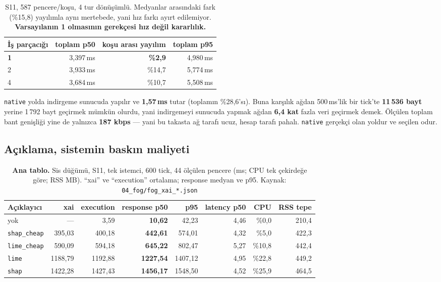 \documentclass[11pt,a4paper]{article}
\newcommand{\ms}{\,ms}
\newcommand{\kod}[1]{\texttt{\small #1}}
\newcommand{\dosya}[1]{\texttt{\footnotesize #1}}
\begin{document}
\begin{table}[H]
\centering\small
\begin{tabular}{@{}lrrr@{}}
\toprule
\textbf{İş parçacığı} & \textbf{toplam p50} & \textbf{koşu arası yayılım} & \textbf{toplam p95} \\
\midrule
\textbf{1} & 3{,}397\ms & \textbf{\%2{,}9} & 4{,}980\ms \\
2 & 3{,}933\ms & \%14{,}7 & 5{,}774\ms \\
4 & 3{,}684\ms & \%10{,}7 & 5{,}508\ms \\
\bottomrule
\end{tabular}
\caption{S11, 587 pencere/koşu, 4 tur dönüşümlü. Medyanlar arasındaki fark
(\%15{,}8) yayılımla aynı mertebede, yani hız farkı ayırt edilemiyor.
\textbf{Varsayılanın 1 olmasının gerekçesi hız değil kararlılık.}}
\end{table}

\begin{bulgu}
\kod{native} yolda indirgeme sunucuda yapılır ve \textbf{1{,}57\ms}{} tutar
(toplamın \%28{,}6'sı). Buna karşılık ağdan 500\ms'lik bir tick'te
\textbf{11\,536 bayt} yerine 1\,792 bayt geçirmek mümkün olurdu, yani
indirgemeyi sunucuda yapmak ağdan \textbf{6{,}4 kat} fazla veri geçirmek
demek. Ölçülen toplam bant genişliği yine de yalnızca \textbf{187 kbps} ---
yani bu takasta ağ tarafı ucuz, hesap tarafı pahalı. \kod{native} gerçekçi
olan yoldur ve seçilen odur.
\end{bulgu}

\subsection{Açıklama, sistemin baskın maliyeti}

\begin{table}[H]
\centering\footnotesize
\begin{tabular}{@{}lrrrrrrr@{}}
\toprule
\textbf{Açıklayıcı} & \textbf{xai} & \textbf{execution} & \textbf{response p50} & \textbf{p95} & \textbf{latency p50} & \textbf{CPU} & \textbf{RSS tepe} \\
\midrule
yok               & ---       & 3{,}59  & \textbf{10{,}62}  & 42{,}23  & 4{,}46 & \%0{,}0 & 210{,}4 \\
\kod{shap\_cheap} & 395{,}03  & 400{,}18 & \textbf{442{,}61} & 574{,}01 & 4{,}32 & \%5{,}0 & 422{,}3 \\
\kod{lime\_cheap} & 590{,}09  & 594{,}18 & \textbf{645{,}22} & 802{,}47 & 5{,}27 & \%10{,}8 & 442{,}4 \\
\kod{lime}        & 1188{,}79 & 1192{,}88 & \textbf{1227{,}54} & 1407{,}12 & 4{,}95 & \%22{,}8 & 449{,}2 \\
\kod{shap}        & 1422{,}28 & 1427{,}43 & \textbf{1456{,}17} & 1548{,}50 & 4{,}52 & \%25{,}9 & 464{,}5 \\
\bottomrule
\end{tabular}
\caption{\textbf{Ana tablo.} Sis düğümü, S11, tek istemci, 600 tick, 44
ölçülen pencere (ms; CPU tek çekirdeğe göre; RSS MB). ``xai'' ve ``execution''
ortalama; response medyan ve p95. Kaynak: \dosya{04\_fog/fog\_xai\_*.json}}
\end{table}
\end{document}
